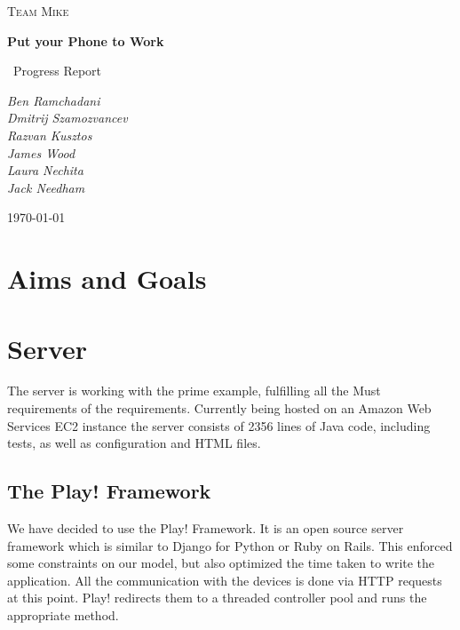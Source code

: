 \documentclass[a4paper,10pt]{article}
\title{}
\author{}
\date{}
\begin{document}
\begin{titlepage}
	\centering
	
	{\scshape\Large Team Mike\par}
	\vspace{4cm}
	{\huge\bfseries Put your Phone to Work\par}
	\vspace{1.5cm}
	{\Large\
	Progress Report
	\par}
	\vspace{2cm}
	{\Large\itshape 
	      Ben Ramchadani\\
	      Dmitrij Szamozvancev\\
	      Razvan Kusztos\\
	      James Wood \\
	      Laura Nechita \\
	      Jack Needham
	      \par}
	\vfill

	{\large \today\par}
\end{titlepage}
\maketitle
\tableofcontents
\newpage
\section{Aims and Goals}
\section{Server}

The server is working with the prime example, fulfilling all the Must requirements of the requirements.
Currently being hosted on an Amazon Web Services EC2 instance the server consists of 2356 lines of Java code, including tests,
as well as configuration and HTML files.


\subsection{The Play! Framework}
We have decided to use the Play! Framework. It is an open source server framework which is similar to Django for Python or Ruby on Rails. This enforced some constraints on our model, but also optimized the time taken to write the application. 
All the communication with the devices is done via HTTP requests at this point. Play! redirects them to a threaded controller pool and runs the appropriate method.
\end{document}
